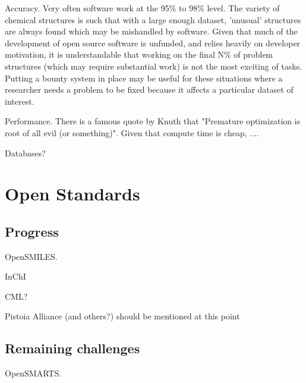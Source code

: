 \documentclass[10pt]{bmc_article}
\newenvironment{bmcformat}{\begin{raggedright}\baselineskip20pt\sloppy\setboolean{publ}{false}}{\end{raggedright}\baselineskip20pt\sloppy}
\begin{document}
\begin{bmcformat}
Accuracy. Very often software work at the 95\% to 98\% level. The variety of chemical structures is such that with a large enough dataset, 'unusual' structures are always found which may be mishandled by software. Given that much of the development of open source software is unfunded, and relies heavily on developer motivation, it is understandable that working on the final N\% of problem structures (which may require substantial work) is not the most exciting of tasks. Putting a bounty system in place may be useful for these situations where a researcher needs a problem to be fixed because it affects a particular dataset of interest.

Performance. There is a famous quote by Knuth that "Premature optimization is root of all evil (or something)". Given that compute time is cheap, ....

Databases?

\section*{Open Standards}
  \subsection*{Progress}

OpenSMILES.

InChI

CML?

Pistoia Alliance (and others?) should be mentioned at this point

  \subsection*{Remaining challenges}

OpenSMARTS.


\end{bmcformat}
\end{document}
